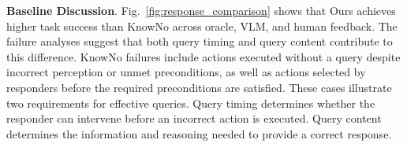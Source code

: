 





\vspace{10pt}
\noindent\textbf{Baseline Discussion}\label{exp:response_comparison}.
Fig.~\ref{fig:response_comparison} shows that Ours achieves higher task success than KnowNo across oracle, VLM, and human feedback. The failure analyses suggest that both query timing and query content contribute to this difference. KnowNo failures include actions executed without a query despite incorrect perception or unmet preconditions, as well as actions selected by responders before the required preconditions are satisfied. These cases illustrate two requirements for effective queries. Query timing determines whether the responder can intervene before an incorrect action is executed. Query content determines the information and reasoning needed to provide a correct response.

